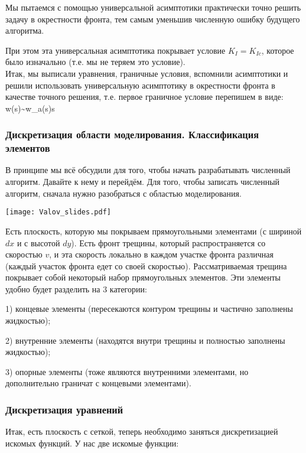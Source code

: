 \documentclass[main.tex]{subfiles}
\begin{document}
Мы пытаемся с помощью универсальной асимптотики практически точно решить задачу в окрестности фронта, тем самым уменьшив численную ошибку будущего алгоритма.

При этом эта универсальная асимптотика покрывает условие $K_{I}=K_{Ic}$, которое было изначально (т.е. мы не теряем это условие).
\\

Итак, мы выписали уравнения, граничные условия, вспомнили асимптотики и решили использовать универсальную асимптотику в окрестности фронта в качестве точного решения, т.е. первое граничное условие перепишем в виде:
\beq
w(s)\sim w_a(s)s
\eeq

\subsubsection{Дискретизация области моделирования. Классификация элементов}

В принципе мы всё обсудили для того, чтобы начать разрабатывать численный алгоритм.
Давайте к нему и перейдём.
Для того, чтобы записать численный алгоритм, сначала нужно разобраться с областью моделирования.

\begin{center}
\texttt{[image: Valov\_slides.pdf]}
\end{center}

Есть плоскость, которую мы покрываем прямоугольными элементами (с шириной $dx$ и с высотой $dy$).
Есть фронт трещины, который распространяется со скоростью $v$, и эта скорость локально в каждом участке фронта различная (каждый участок фронта едет со своей скоростью).
Рассматриваемая трещина покрывает собой некоторый набор прямоугольных элементов.
Эти элементы удобно будет разделить на 3 категории:

1) концевые элементы (пересекаются контуром трещины и частично заполнены жидкостью);

2) внутренние элементы (находятся внутри трещины и полностью заполнены жидкостью);

3) опорные элементы (тоже являются внутренними элементами, но дополнительно граничат с концевыми элементами).

\subsubsection{Дискретизация уравнений}

Итак, есть плоскость с сеткой, теперь необходимо заняться дискретизацией искомых функций.
У нас две искомые функции:
\end{document}
